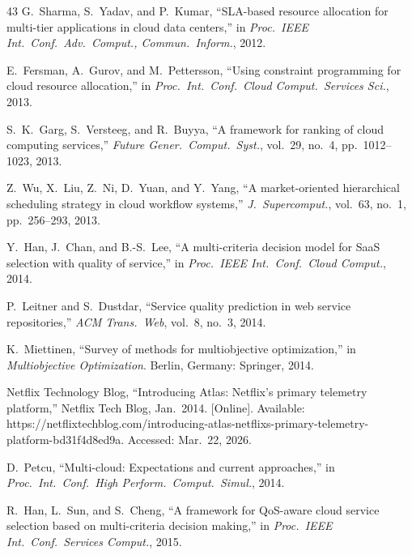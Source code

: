 \documentclass[journal]{IEEEtran}
\begin{document}
\begin{thebibliography}{43}
G.~Sharma, S.~Yadav, and P.~Kumar, ``SLA-based resource allocation for
  multi-tier applications in cloud data centers,'' in \emph{Proc.\ IEEE Int.\
  Conf.\ Adv.\ Comput., Commun.\ Inform.}, 2012.

\bibitem{fersman_csp}
E.~Fersman, A.~Gurov, and M.~Pettersson, ``Using constraint programming for
  cloud resource allocation,'' in \emph{Proc.\ Int.\ Conf.\ Cloud Comput.\
  Services Sci.}, 2013.

S.~K.~Garg, S.~Versteeg, and R.~Buyya, ``A framework for ranking of cloud
  computing services,'' \emph{Future Gener.\ Comput.\ Syst.}, vol.~29, no.~4,
  pp.~1012--1023, 2013.

Z.~Wu, X.~Liu, Z.~Ni, D.~Yuan, and Y.~Yang, ``A market-oriented hierarchical
  scheduling strategy in cloud workflow systems,'' \emph{J.\ Supercomput.},
  vol.~63, no.~1, pp.~256--293, 2013.

Y.~Han, J.~Chan, and B.-S.~Lee, ``A multi-criteria decision model for SaaS
  selection with quality of service,'' in \emph{Proc.\ IEEE Int.\ Conf.\ Cloud
  Comput.}, 2014.

P.~Leitner and S.~Dustdar, ``Service quality prediction in web service
  repositories,'' \emph{ACM Trans.\ Web}, vol.~8, no.~3, 2014.

K.~Miettinen, ``Survey of methods for multiobjective optimization,'' in
  \emph{Multiobjective Optimization}. Berlin, Germany: Springer, 2014.

\bibitem{netflix_atlas}
Netflix Technology Blog, ``Introducing Atlas: Netflix's primary telemetry
  platform,'' Netflix Tech Blog, Jan.~2014. [Online]. Available:
  https://netflixtechblog.com/introducing-atlas-netflixs-primary-telemetry-platform-bd31f4d8ed9a.
  Accessed: Mar.~22, 2026.

D.~Petcu, ``Multi-cloud: Expectations and current approaches,'' in \emph{Proc.\
  Int.\ Conf.\ High Perform.\ Comput.\ Simul.}, 2014.

\bibitem{han_qos}
R.~Han, L.~Sun, and S.~Cheng, ``A framework for QoS-aware cloud service
  selection based on multi-criteria decision making,'' in \emph{Proc.\ IEEE
  Int.\ Conf.\ Services Comput.}, 2015.


\end{thebibliography}
\end{document}
